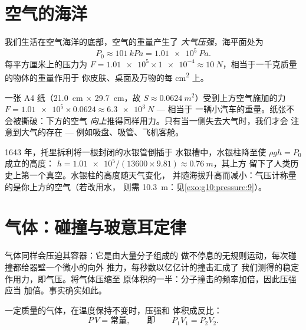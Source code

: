 \section{空气的海洋}

\begin{definition}[大气压强]\label{def:g10:pressure:atmospheric}
我们生活在空气海洋的底部，空气的重量产生了
\emph{大气压强}，海平面处为
\[
P_0 \approx \qty{101}{kPa} = \qty{1.01e5}{Pa}.
\]
每平方厘米上的压力为 $F = \num{1.01e5} \times \num{1e-4}
\approx \qty{10}{N}$，相当于一千克质量的物体的重量作用于
你皮肤、桌面及万物的每 \unit{cm^2} 上。
\end{definition}

\begin{example}[看不见的负荷]\label{ex:g10:pressure:sheet}
一张 A4 纸（\qty{21.0}{cm} $\times$ \qty{29.7}{cm}，故
$S \approx \qty{0.0624}{m^2}$）受到上方空气施加的力
$F = \num{1.01e5} \times 0.0624 \approx \qty{6.3e3}{N}$ --- 相当于
一辆小汽车的重量。纸张不会被撕破：下方的空气
\emph{向上}推得同样用力。只有当一侧失去大气时，我们才会
注意到大气的存在 --- 例如吸盘、吸管、飞机客舱。
\end{example}

\begin{remark}[托里拆利气压计]\label{rem:g10:pressure:torricelli}
1643 年，托里拆利将一根封闭的水银管倒插于
水银槽中，水银柱降至使 $\rho g h = P_0$ 成立的高度：
$h = \num{1.01e5}/(13600 \times 9.81) \approx \qty{0.76}{m}$，其上方
留下了人类历史上第一个真空。水银柱的高度随天气变化，
并随海拔升高而减小：气压计称量的是你上方的空气（若改用水，
则需 \qty{10.3}{m}：见\cref{exo:g10:pressure:9}）。
\end{remark}

\section{气体：碰撞与玻意耳定律}

气体同样会压迫其容器：它是由大量分子组成的
做不停息的无规则运动，每次碰撞都给器壁一个微小的向外
推力，每秒数以亿亿计的撞击汇成了
我们测得的稳定作用力，即气压。将气体压缩至
原体积的一半：分子撞击的频率加倍，因此压强应当
加倍。事实确实如此。

\begin{proposition}[玻意耳定律]\label{prop:g10:pressure:boyle}
一定质量的气体，在温度保持不变时，压强和
体积成反比：
\[
P \, V = \text{常量},
\qquad\text{即}\qquad
P_1 V_1 = P_2 V_2 .
\]
\end{proposition}
\admitted

